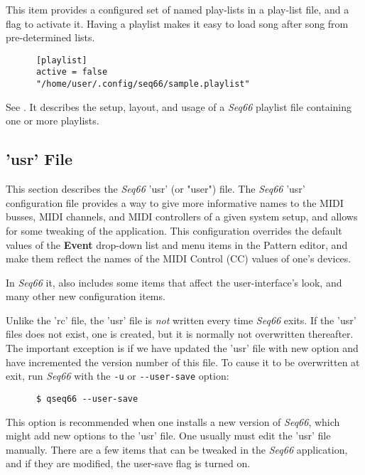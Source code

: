    This item provides a configured set of named play-lists in a play-list file,
   and a flag to activate it.
   Having a playlist makes it easy to load song after song from pre-determined
   lists.
   
   \index{[playlist]}
   \begin{verbatim}
      [playlist]
      active = false
      "/home/user/.config/seq66/sample.playlist"
   \end{verbatim}

   See .
   It describes the setup, layout, and usage of a
   \textsl{Seq66} playlist file containing one or more playlists.

\subsection{'usr' File}
\label{subsec:configuration_usr}

   This section describes the \textsl{Seq66} 'usr' (or "user") file.
   The \textsl{Seq66} 'usr'
   configuration file provides a way to give more
   informative names to the MIDI busses, MIDI channels, and MIDI controllers of
   a given system setup, and allows for some tweaking of the application.
   This configuration overrides the default values
   of the \textbf{Event} drop-down list and menu items in the Pattern editor,
   and make them reflect the names of the MIDI Control (CC) values of one's
   devices.

   In \textsl{Seq66} it, also includes some items that affect the
   user-interface's look, and many other new configuration items.

   Unlike the 'rc' file, the 'usr' file is \textsl{not} written every time
   \textsl{Seq66} exits.  If the 'usr' files does not exist, one is
   created, but it is normally not overwritten thereafter.
   The important exception is if we have updated the 'usr' file with new option
   and have incremented the version number of this file.
   To cause it to be overwritten at exit, run \textsl{Seq66} with the
   \texttt{-u} or \texttt{-{}-user-save} option:

   \begin{verbatim}
      $ qseq66 --user-save
   \end{verbatim}

   This option is recommended when one installs a new version of
   \textsl{Seq66}, which might add new options to the 'usr' file.
   One usually must edit the 'usr' file manually.
   There are a few items that can be tweaked in the \textsl{Seq66} application,
   and if they are modified, the user-save flag is turned on.

